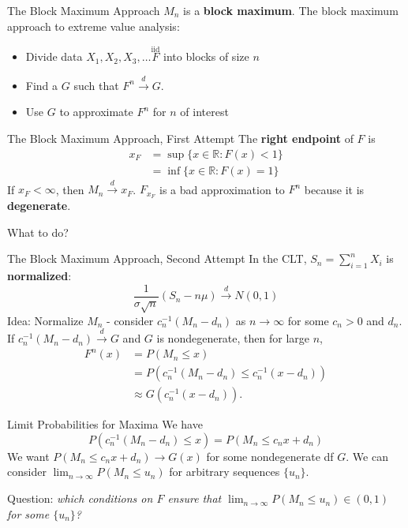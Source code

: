 \documentclass{beamer}
\begin{document}
\begin{frame}{The Block Maximum Approach}
    $M_n$ is a \textbf{block maximum}. The block maximum approach to extreme value analysis:
    \begin{itemize}
        \item Divide data $X_1, X_2, X_3, \ldots \overset{\text{iid}} F$ into blocks of size $n$
        \item Find a $G$ such that $F^n \xrightarrow{d} G$.
        \item Use $G$ to approximate $F^n$ for $n$ of interest
    \end{itemize}
\end{frame}

\begin{frame}{The Block Maximum Approach, First Attempt}
    The \textbf{right endpoint} of $F$ is
    \begin{align*}
    x_F &= \sup\{x \in \mathbb{R} : F(x) < 1\} \\
    &= \inf\{x \in \mathbb{R} : F(x) = 1\}
    \end{align*}
    If $x_F < \infty$, then $M_n \xrightarrow{d} x_F$. $F_{x_F}$ is a bad approximation to $F^n$ because it is \textbf{degenerate}.

    \bigskip

    What to do?
\end{frame}

\begin{frame}{The Block Maximum Approach, Second Attempt}
    In the CLT, $S_n = \sum_{i = 1}^n X_i$ is \textbf{normalized}:
    \[
    \frac{1}{\sigma\sqrt{n}}(S_n - n\mu) \xrightarrow{d} N(0, 1)
    \]
    Idea: Normalize $M_n$ - consider $c_n^{-1}(M_n - d_n)$ as $n \to \infty$ for some $c_n > 0$ and $d_n$. If $c_n^{-1}(M_n - d_n) \xrightarrow{d} G$ and $G$ is nondegenerate, then for large $n$,
    \begin{align*}
        F^n(x) &= P(M_n \le x) \\
        &= P(c_n^{-1}(M_n - d_n) \le c_n^{-1}(x - d_n)) \\
        &\approx G(c_n^{-1}(x - d_n)).
    \end{align*}
\end{frame}

\begin{frame}{Limit Probabilities for Maxima}
    We have
    \[
    P(c_n^{-1}(M_n - d_n) \le x) = P(M_n \le c_n x + d_n)
    \]
    We want $P(M_n \le c_n x + d_n) \to G(x)$ for some nondegenerate df $G$. We can consider $\lim_{n \to \infty} P(M_n \le u_n)$ for arbitrary sequences $\{u_n\}$.
    
    \bigskip
    
    Question: \textit{which conditions on $F$ ensure that $\lim_{n \to \infty} P(M_n \le u_n) \in (0, 1)$ for some $\{u_n\}$?}
\end{frame}
\end{document}
